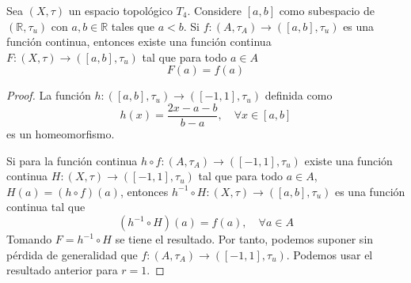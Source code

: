 \documentclass[12pt]{report}
\theoremstyle{largebreak}
\newcommand\cf[3]{\ensuremath{#1:#2\rightarrow#3}}
\begin{document}
    \begin{theor}
        Sea $(X,\tau)$ un espacio topológico $T_4$. Considere $[a,b]$ como subespacio de $(\mathbb{R},\tau_u)$ con $a,b\in\mathbb{R}$ tales que $a<b$. Si $\cf{f}{(A,\tau_A)}{([a,b],\tau_u)}$ es una función continua, entonces existe una función continua $\cf{F}{(X,\tau)}{([a,b],\tau_u)}$ tal que para todo $a\in A$
        \begin{equation*}
            F(a)=f(a)
        \end{equation*}
    \end{theor}

    \begin{proof}
        La función $\cf{h}{([a,b],\tau_u)}{([-1,1],\tau_u)}$ definida como
        \begin{equation*}
            h(x)=\frac{2x-a-b}{b-a},\quad\forall x\in[a,b]
        \end{equation*}
        es un homeomorfismo.
        
        Si para la función continua $\cf{h\circ f}{(A,\tau_A)}{([-1,1],\tau_u)}$ existe una función continua $\cf{H}{(X,\tau)}{([-1,1],\tau_u)}$ tal que para todo $a\in A$, $H(a)=(h\circ f)(a)$, entonces $\cf{h^{-1}\circ H}{(X,\tau)}{([a,b],\tau_u)}$ es una función continua tal que
        \begin{equation*}
            (h^{-1}\circ H)(a)=f(a),\quad\forall a\in A
        \end{equation*}
        Tomando $F=h^{-1}\circ H$ se tiene el resultado. Por tanto, podemos suponer sin pérdida de generalidad que $\cf{f}{(A,\tau_A)}{([-1,1],\tau_u)}$. Podemos usar el resultado anterior para $r=1$.


\end{proof}
\end{document}
